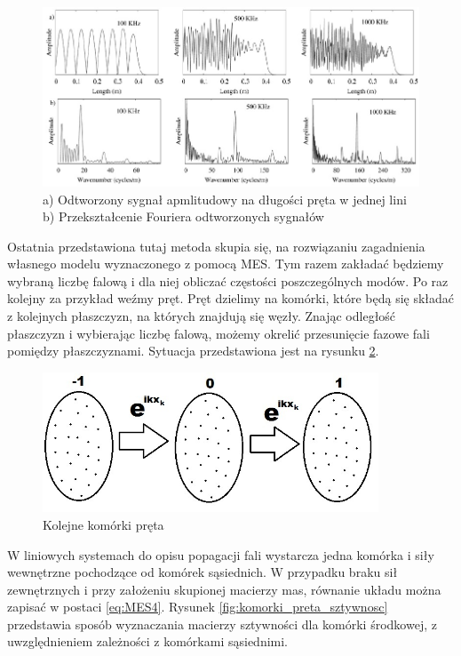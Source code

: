 \begin{figure}[h]
\centering
\includegraphics[width=12cm]{Zdjecia/2/widmo_wymuszenia_szerokopasmowe2}
\caption{a) Odtworzony sygnał apmlitudowy na długości pręta w jednej lini b) Przekształcenie Fouriera odtworzonych sygnałów}
\label{fig:szer_odp_przestrzenne}
\end{figure}

\vspace{3mm}

Ostatnia przedstawiona tutaj metoda skupia się, na rozwiązaniu zagadnienia własnego modelu wyznaczonego z pomocą MES. Tym razem zakładać będziemy wybraną liczbę falową i dla niej obliczać częstości poszczególnych modów. 
Po raz kolejny za przykład weźmy pręt. Pręt dzielimy na komórki, które będą się składać z kolejnych płaszczyzn, na których znajdują się węzły. Znając odległość płaszczyzn i wybierając liczbę falową, możemy okrelić przesunięcie fazowe fali pomiędzy płaszczyznami. Sytuacja przedstawiona jest na rysunku \ref{fig:komorki_preta}.


\begin{figure}[h]
\centering
\includegraphics[width=10cm]{Zdjecia/2/metoda_numeryczna3}
\caption{Kolejne komórki pręta}
\label{fig:komorki_preta}
\end{figure}

W liniowych systemach do opisu popagacji fali wystarcza jedna komórka i siły wewnętrzne pochodzące od komórek sąsiednich. W przypadku braku sił zewnętrznych i przy założeniu skupionej macierzy mas, równanie układu można zapisać w postaci \ref{eq:MES4}. Rysunek \ref{fig:komorki_preta_sztywnosc} przedstawia sposób wyznaczania macierzy sztywności dla komórki środkowej, z uwzględnieniem zależności z komórkami sąsiednimi.

